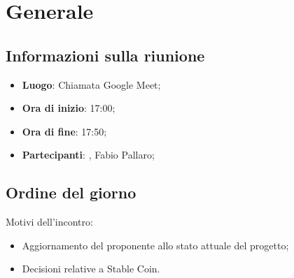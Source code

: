 \section{Generale}

\vspace{10pt}


\subsection{Informazioni sulla riunione}
\begin{itemize}
	\item \textbf{Luogo}: Chiamata Google Meet;
	\item \textbf{Ora di inizio}: 17:00;
	\item \textbf{Ora di fine}: 17:50;
	\item \textbf{Partecipanti}: \team, Fabio Pallaro;
\end{itemize}

\vspace{5pt}

\subsection{Ordine del giorno}
Motivi dell'incontro:
\begin{itemize}
	\item Aggiornamento del proponente allo stato attuale del progetto;
	\item Decisioni relative a Stable Coin.
\end{itemize}
